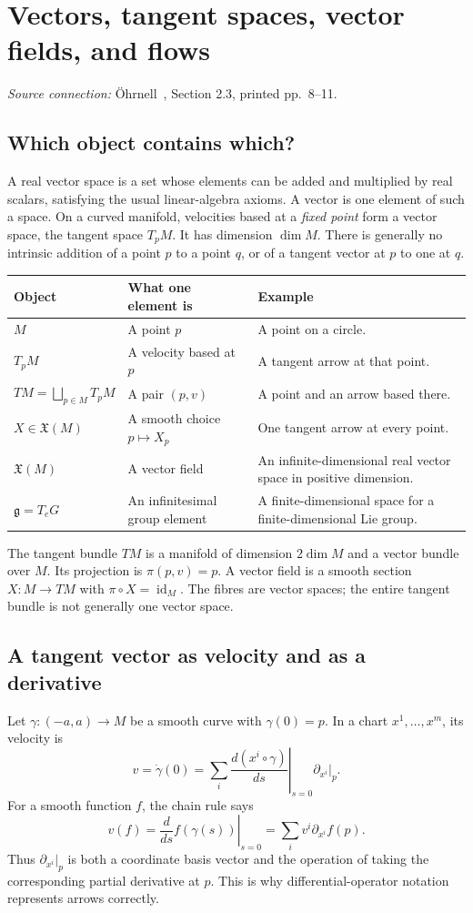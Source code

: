 \documentclass[11pt,a4paper]{article}
\numberwithin{equation}{section}
\theoremstyle{definition}
\theoremstyle{plain}
\theoremstyle{remark}
\newcommand{\g}{\mathfrak g}
\newcommand{\id}{\operatorname{id}}
\newcommand{\source}[1]{\textit{Source connection:} \"Ohrnell~\cite{ohrnell}, #1.}
\begin{document}
\section{Vectors, tangent spaces, vector fields, and flows}\label{sec:vectors}
\source{Section 2.3, printed pp.~8--11}
\subsection{Which object contains which?}
A real vector space is a set whose elements can be added and multiplied by real scalars, satisfying the usual linear-algebra axioms. A vector is one element of such a space. On a curved manifold, velocities based at a \emph{fixed point} form a vector space, the tangent space $T_pM$. It has dimension $\dim M$. There is generally no intrinsic addition of a point $p$ to a point $q$, or of a tangent vector at $p$ to one at $q$.

\begin{tabularx}{\linewidth}{@{}p{.25\linewidth}p{.26\linewidth}Y@{}}
\toprule Object & What one element is & Example \\
\midrule $M$ & A point $p$ & A point on a circle.\\
$T_pM$ & A velocity based at $p$ & A tangent arrow at that point.\\
$TM=\bigsqcup_{p\in M}T_pM$ & A pair $(p,v)$ & A point and an arrow based there.\\
$X\in\mathfrak X(M)$ & A smooth choice $p\mapsto X_p$ & One tangent arrow at every point.\\
$\mathfrak X(M)$ & A vector field & An infinite-dimensional real vector space in positive dimension.\\
$\g=T_eG$ & An infinitesimal group element & A finite-dimensional space for a finite-dimensional Lie group.\\
\bottomrule
\end{tabularx}
The tangent bundle $TM$ is a manifold of dimension $2\dim M$ and a vector bundle over $M$. Its projection is $\pi(p,v)=p$. A vector field is a smooth section $X:M\to TM$ with $\pi\circ X=\id_M$. The fibres are vector spaces; the entire tangent bundle is not generally one vector space.

\subsection{A tangent vector as velocity and as a derivative}
Let $\gamma:(-a,a)\to M$ be a smooth curve with $\gamma(0)=p$. In a chart $x^1,\ldots,x^m$, its velocity is
\[
v=\dot\gamma(0)=\sum_i\left.\frac{d(x^i\circ\gamma)}{ds}\right|_{s=0}\partial_{x^i}\big|_p.
\]
For a smooth function $f$, the chain rule says
\[
v(f)=\left.\frac{d}{ds}f(\gamma(s))\right|_{s=0}
=\sum_i v^i\partial_{x^i}f(p).
\]
Thus $\partial_{x^i}|_p$ is both a coordinate basis vector and the operation of taking the corresponding partial derivative at $p$. This is why differential-operator notation represents arrows correctly.
\end{document}
